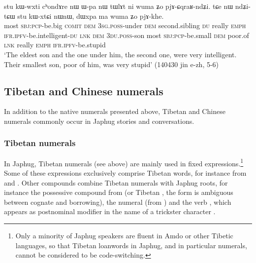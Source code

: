 \begin{exe}
\ex  \label{ex:Wpa.nW}
\gll stu kɯ-wxti cʰondɤre nɯ ɯ-pa nɯ tɯlɤt ni wuma ʑo pjɤ-ɕqraʁ-ndʑi. tɕe nɯ ndʑi-tɕɯ stu kɯ-xtɕi nɯnɯ, dɯxpa ma wuma ʑo pjɤ-khe. \\
most \textsc{sbj}:\textsc{pcp}-be.big \textsc{comit} \textsc{dem} \textsc{3sg}.\textsc{poss}-under \textsc{dem} second.sibling \textsc{du} really \textsc{emph} \textsc{ifr}.\textsc{ipfv}-be.intelligent-\textsc{du} \textsc{lnk} \textsc{dem} \textsc{3du}.\textsc{poss}-son most \textsc{sbj}:\textsc{pcp}-be.small \textsc{dem} poor.of \textsc{lnk} really \textsc{emph} \textsc{ifr}.\textsc{ipfv}-be.stupid \\
\glt `The eldest son and the one under him, the second one, were very intelligent. Their smallest son, poor of him, was very stupid' (140430 jin e-zh, 5-6) 
\end{exe}
 
\subsection{Tibetan and Chinese numerals}  
In addition to the native numerals presented above, Tibetan and Chinese numerals commonly occur in Japhug stories and conversations.

 \subsubsection{Tibetan numerals} \label{sec:tibetan.numerals}

In Japhug, Tibetan numerals (see  above) are mainly used in fixed expressions.\footnote{Only a minority of Japhug speakers are fluent in Amdo or other Tibetic languages, so that Tibetan loanwords in Japhug, and in particular numerals, cannot be considered to be code-switching. 
} Some of these expressions exclusively comprise Tibetan words, for instance  from  and .  Other compounds combine Tibetan numerals with Japhug roots, for instance the possessive compound from  (or Tibetan , the form is ambiguous between cognate and borrowing), the numeral  (from  ) and the verb , which appears as postnominal modifier in the name of a trickster character .
 

